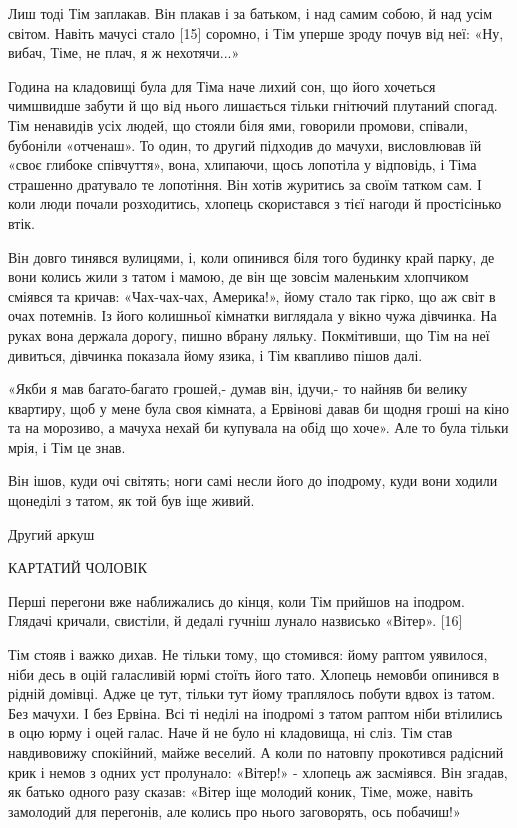Лиш тоді Тім заплакав. Він плакав і за батьком, і над самим собою, й над усім
світом. Навіть мачусі стало [15] соромно, і Тім уперше зроду почув від неї:
«Ну, вибач, Тіме, не плач, я ж нехотячи...»

Година на кладовищі була для Тіма наче лихий сон, що його хочеться чимшвидше
забути й що від нього лишається тільки гнітючий плутаний спогад. Тім ненавидів
усіх людей, що стояли біля ями, говорили промови, співали, бубоніли «отченаш».
То один, то другий підходив до мачухи, висловлював їй «своє глибоке співчуття»,
вона, хлипаючи, щось лопотіла у відповідь, і Тіма страшенно дратувало те
лопотіння. Він хотів журитись за своїм татком сам. І коли люди почали
розходитись, хлопець скористався з тієї нагоди й простісінько втік.

Він довго тинявся вулицями, і, коли опинився біля того будинку край парку, де
вони колись жили з татом і мамою, де він ще зовсім маленьким хлопчиком сміявся
та кричав: «Чах-чах-чах, Америка!», йому стало так гірко, що аж світ в очах
потемнів. Із його колишньої кімнатки виглядала у вікно чужа дівчинка. На руках
вона держала дорогу, пишно вбрану ляльку. Покмітивши, що Тім на неї дивиться,
дівчинка показала йому язика, і Тім квапливо пішов далі.

«Якби я мав багато-багато грошей,- думав він, ідучи,- то найняв би велику
квартиру, щоб у мене була своя кімната, а Ервінові давав би щодня гроші на кіно
та на морозиво, а мачуха нехай би купувала на обід що хоче». Але то була тільки
мрія, і Тім це знав.

Він ішов, куди очі світять; ноги самі несли його до іподрому, куди вони ходили
щонеділі з татом, як той був іще живий.

Другий аркуш

КАРТАТИЙ ЧОЛОВІК

Перші перегони вже наближались до кінця, коли Тім прийшов на іподром. Глядачі
кричали, свистіли, й дедалі гучніш лунало назвисько «Вітер». [16]

Тім стояв і важко дихав. Не тільки тому, що стомився: йому раптом уявилося,
ніби десь в оцій галасливій юрмі стоїть його тато. Хлопець немовби опинився в
рідній домівці. Адже це тут, тільки тут йому траплялось побути вдвох із татом.
Без мачухи. І без Ервіна. Всі ті неділі на іподромі з татом раптом ніби
втілились в оцю юрму і оцей галас. Наче й не було ні кладовища, ні сліз. Тім
став навдивовижу спокійний, майже веселий. А коли по натовпу прокотився
радісний крик і немов з одних уст пролунало: «Вітер!» - хлопець аж засміявся.
Він згадав, як батько одного разу сказав: «Вітер іще молодий коник, Тіме, може,
навіть замолодий для перегонів, але колись про нього заговорять, ось побачиш!»

